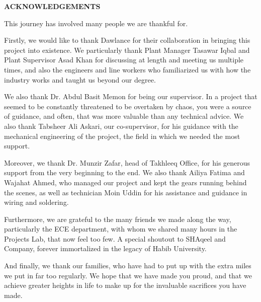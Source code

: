 \clearpage
\begin{centering}
\textbf{ACKNOWLEDGEMENTS}\\
\vspace{\baselineskip}
\end{centering}

This journey has involved many people we are thankful for. \newline

Firstly, we would like to thank Dawlance for their collaboration in bringing this project into existence. We particularly thank Plant Manager Tasawar Iqbal and Plant Supervisor Asad Khan for discussing at length and meeting us multiple times, and also the engineers and line workers who familiarized us with how the industry works and taught us beyond our degree. 

We also thank Dr. Abdul Basit Memon for being our supervisor. In a project that seemed to be constantly threatened to be overtaken by chaos, you were a source of guidance, and often, that was more valuable than any technical advice. We also thank Tabsheer Ali Askari, our co-supervisor, for his guidance with the mechanical engineering of the project, the field in which we needed the most support.

Moreover, we thank Dr. Munzir Zafar, head of Takhleeq Office, for his generous support from the very beginning to the end. We also thank Ailiya Fatima and Wajahat Ahmed, who managed our project and kept the gears running behind the scenes, as well as technician Moin Uddin for his assistance and guidance in wiring and soldering. 

Furthermore, we are grateful to the many friends we made along the way, particularly the ECE department, with whom we shared many hours in the Projects Lab, that now feel too few. A special shoutout to SHAqeel and Company, forever immortalized in the legacy of Habib University.

And finally, we thank our families, who have had to put up with the extra miles we put in far too regularly. We hope that we have made you proud, and that we achieve greater heights in life to make up for the invaluable sacrifices you have made.

\clearpage
